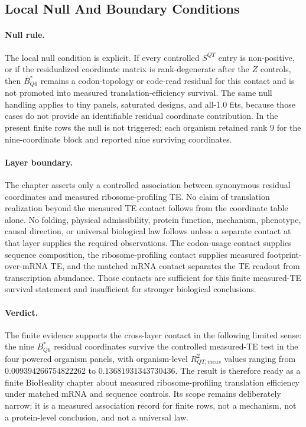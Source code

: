 \subsection{Local Null And Boundary Conditions}\label{sec:q6-ribosome-te-survival-boundary}

\paragraph{Null rule.}
The local null condition is explicit.  If every controlled $S^{QT}$ entry is non-positive, or if the residualized coordinate matrix is rank-degenerate after the $Z$ controls, then $B^*_{Q6}$ remains a codon-topology or code-read residual for this contact and is not promoted into measured translation-efficiency survival.  The same null handling applies to tiny panels, saturated designs, and all-$1.0$ fits, because those cases do not provide an identifiable residual coordinate contribution.  In the present finite rows the null is not triggered: each organism retained rank $9$ for the nine-coordinate block and reported nine surviving coordinates.

\paragraph{Layer boundary.}
The chapter asserts only a controlled association between synonymous residual coordinates and measured ribosome-profiling TE.  No claim of translation realization beyond the measured TE contact follows from the coordinate table alone.  No folding, physical admissibility, protein function, mechanism, phenotype, causal direction, or universal biological law follows unless a separate contact at that layer supplies the required observations.  The codon-usage contact supplies sequence composition, the ribosome-profiling contact supplies measured footprint-over-mRNA TE, and the matched mRNA contact separates the TE readout from transcription abundance.  Those contacts are sufficient for this finite measured-TE survival statement and insufficient for stronger biological conclusions.

\paragraph{Verdict.}
The finite evidence supports the cross-layer contact in the following limited sense: the nine $B^*_{Q6}$ residual coordinates survive the controlled measured-TE test in the four powered organism panels, with organism-level $R^2_{QT,meas}$ values ranging from $0.009394266754822262$ to $0.13681931343730436$.  The result is therefore ready as a finite BioReality chapter about measured ribosome-profiling translation efficiency under matched mRNA and sequence controls.  Its scope remains deliberately narrow: it is a measured association record for finite rows, not a mechanism, not a protein-level conclusion, and not a universal law.

